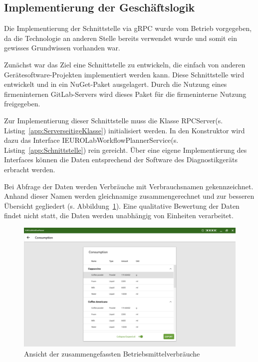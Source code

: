 \subsection{Implementierung der Geschäftslogik}
\label{sec:ImplementierungDerGeschäftslogik}
Die Implementierung der Schnittstelle via {\acs{gRPC}} wurde vom Betrieb vorgegeben, da die Technologie an anderen Stelle bereits verwendet wurde und somit ein gewisses Grundwissen vorhanden war.

Zunächst war das Ziel eine Schnittstelle zu entwickeln, die einfach von anderen Gerätesoftware-Projekten implementiert werden kann. Diese Schnittstelle wird entwickelt und in ein {\acs{NuGet}}-Paket ausgelagert. Durch die Nutzung eines firmeninternen {\acs{GitLab}}-Servers wird dieses Paket für die firmeninterne Nutzung freigegeben.

Zur Implementierung dieser Schnittstelle muss die Klasse \glqq RPCServer\grqq \space (s. Listing~\ref{app:ServerseitigeKlasse}) initialisiert werden. In den Konstruktor wird dazu das Interface \glqq IEUROLabWorkflowPlannerService\grqq \space (s. Listing~\ref{app:Schnittstelle}) rein gereicht. Über eine eigene Implementierung des Interfaces können die Daten entsprechend der Software des Diagnostikgeräts erbracht werden.

Bei Abfrage der Daten werden Verbräuche mit Verbrauchsnamen gekennzeichnet. Anhand dieser Namen werden gleichnamige zusammengerechnet und zur besseren Übersicht gegliedert (s. Abbildung~\ref{fig:Consumptions}). Eine qualitative Bewertung der Daten findet nicht statt, die Daten werden unabhängig von Einheiten verarbeitet.

\begin{figure}[htb]
	\centering
	\includegraphics[scale=0.5]{Bilder/VerbrauchAnsicht.png}
	\caption{Ansicht der zusammengefassten Betriebsmittelverbräuche}
	\label{fig:Consumptions}
\end{figure}